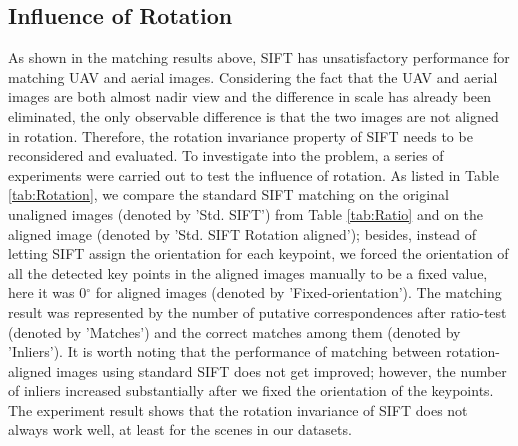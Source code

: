 \subsection{Influence of Rotation}\label{sec:Influence of rotation}
As shown in the matching results above, SIFT has unsatisfactory performance for matching UAV and aerial images.
Considering the fact that the UAV and aerial images are both almost nadir view and the difference in scale has already been eliminated, the only observable difference is that the two images are not aligned in rotation. 
Therefore, the rotation invariance property of SIFT needs to be reconsidered and evaluated. 
To investigate into the problem, a series of experiments were carried out to test the influence of rotation. 
As listed in Table \ref{tab:Rotation}, we compare the standard SIFT matching on the original unaligned images (denoted by 'Std. SIFT') from Table \ref{tab:Ratio} and on the aligned image (denoted by 'Std. SIFT Rotation aligned'); besides, instead of letting SIFT assign the orientation for each keypoint, we forced the orientation of all the detected key points in the aligned images manually to be a fixed value, here it was 0$^\circ$ for aligned images (denoted by 'Fixed-orientation').
The matching result was represented by the number of putative correspondences after ratio-test (denoted by 'Matches') and the correct matches among them (denoted by 'Inliers').
It is worth noting that the performance of matching between rotation-aligned images using standard SIFT does not get improved; however, the number of inliers increased substantially after we fixed the orientation of the keypoints. 
The experiment result shows that the rotation invariance of SIFT does not always work well, at least for the scenes in our datasets.

